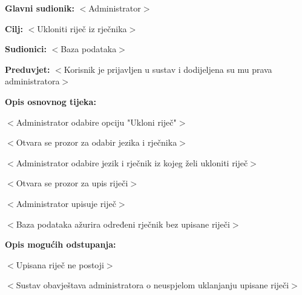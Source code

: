					\noindent {}
					\begin{packed_item}
	
						\item \textbf{Glavni sudionik: }$<$Administrator$>$
						\item  \textbf{Cilj:} $<$Ukloniti riječ iz rječnika$>$
						\item  \textbf{Sudionici:} $<$Baza podataka$>$
						\item  \textbf{Preduvjet:} $<$Korisnik je prijavljen u sustav i dodijeljena su mu prava administratora$>$
						\item  \textbf{Opis osnovnog tijeka:}
						
						\item[] \begin{packed_enum}
	
							\item $<$Administrator odabire opciju "Ukloni riječ"$>$
							\item $<$Otvara se prozor za odabir jezika i rječnika$>$
							\item $<$Administrator odabire jezik i rječnik iz kojeg želi ukloniti riječ$>$
							\item $<$Otvara se prozor za upis riječi$>$
							\item $<$Administrator upisuje riječ$>$
							\item $<$Baza podataka ažurira određeni rječnik bez upisane riječi$>$
						\end{packed_enum}

						\item  \textbf{Opis mogućih odstupanja:}
						
						\item[] \begin{packed_item}
	
							\item[5.a] $<$Upisana riječ ne postoji$>$
							\item[] \begin{packed_enum}
								
								\item $<$Sustav obavještava administratora o neuspjelom uklanjanju upisane riječi$>$
								
							\end{packed_enum}
						\end{packed_item}
						
					\end{packed_item}

